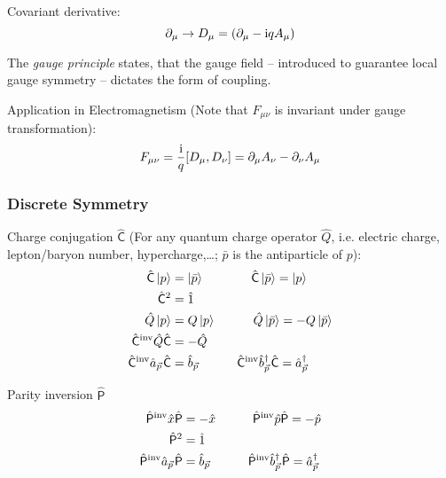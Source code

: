 			\noindent
			Covariant derivative:
			\begin{equation}
				\partial_\mu \rightarrow D_\mu = \qty(\partial_\mu - \mathrm{i} q A_\mu) \\
			\end{equation}

			\noindent
			The \emph{gauge principle} states, that the gauge field -- introduced to guarantee local gauge symmetry -- dictates the form of coupling.

			\noindent
			Application in Electromagnetism (Note that $F_{\mu\nu}$ is invariant under gauge transformation):
			\begin{equation}
				F_{\mu\nu} =  \frac{\i}{q} \comm{D_\mu}{D_\nu} = \partial_\mu A_\nu - \partial_\nu A_\mu
			\end{equation}

		\subsubsection{Discrete Symmetry}
			Charge conjugation $\hat{\mathsf{C}}$ (For any quantum charge operator $\hat{Q}$, i.e. electric charge, lepton/baryon number, hypercharge,\dots; $\bar{p}$ is the antiparticle of $p$):
			\begin{equation}
				\begin{aligned}
					\hat{\mathsf{C}} \Ket{p} &= \Ket{\bar{p}} 
					\phantom{Q}\hsp \hat{\mathsf{C}} \Ket{\bar{p}} = \Ket{p} \\
					\hat{\mathsf{C}}^2 &= \hat{1} \\ 
					\hat{Q} \Ket{p} &= Q \Ket{p} 
					\hsp \hat{Q} \Ket{\bar{p}} = -Q\Ket{\bar{p}} \\
					\inv{\hat{\mathsf{C}}} \hat{Q} \hat{\mathsf{C}} &= -\hat{Q} \\
					\inv{\hat{\mathsf{C}}}\hat{a}_{\vec{p}} \hat{\mathsf{C}} &= \hat{b}_{\vec{p}} 
					\hsp \inv{\hat{\mathsf{C}}}\hat{b}^\dagger_{\vec{p}} \hat{\mathsf{C}} = \hat{a}^\dagger_{\vec{p}} \\
				\end{aligned}
			\end{equation}

			\noindent
			Parity inversion $\hat{\mathsf{P}}$
			\begin{equation}
				\begin{aligned}
					\inv{\hat{\mathsf{P}}} \hat{x} \hat{\mathsf{P}} &= - \hat{x}
					\hsp \inv{\hat{\mathsf{P}}} \hat{p} \hat{\mathsf{P}} = - \hat{p} \\
					\hat{\mathsf{P}}^2 &= \hat{1} \\ 
					\inv{\hat{\mathsf{P}}}\hat{a}_{\vec{p}} \hat{\mathsf{P}} &= \hat{b}_{\vec{p}} 
					\hsp \inv{\hat{\mathsf{P}}}\hat{b}^\dagger_{\vec{p}} \hat{\mathsf{P}} = \hat{a} ^\dagger_{\vec{p}} \\
				\end{aligned}
			\end{equation}

